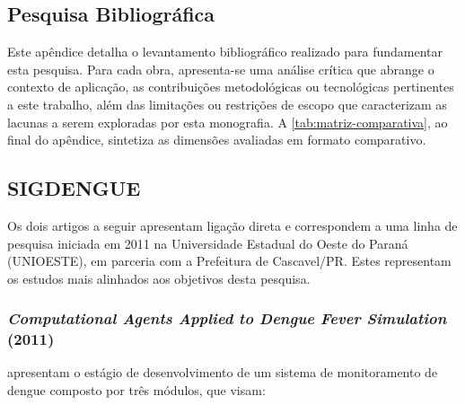 
\begin{apendicesenv}

\partapendices

\chapter{Pesquisa Bibliográfica}
\label{ap-pesquisa-bibliografica}

Este apêndice detalha o levantamento bibliográfico realizado para fundamentar esta pesquisa.
Para cada obra, apresenta-se uma análise crítica que abrange o
contexto de aplicação, as contribuições metodológicas ou tecnológicas pertinentes
a este trabalho, além das limitações ou restrições de escopo que caracterizam as
lacunas a serem exploradas por esta monografia. A \autoref{tab:matriz-comparativa},
ao final do apêndice, sintetiza as dimensões avaliadas em formato comparativo.

\section{SIGDENGUE}
\label{ap:sigdengue-linha}

Os dois artigos a seguir apresentam ligação direta e correspondem a uma linha de
pesquisa iniciada em 2011 na Universidade Estadual do Oeste do Paraná (UNIOESTE),
em parceria com a Prefeitura de Cascavel/PR. Estes representam os estudos mais
alinhados aos objetivos desta pesquisa.

\subsection{\textit{Computational Agents Applied to Dengue Fever Simulation} (2011)}
\label{ap:rizzi2011}

 apresentam o estágio de desenvolvimento de um
sistema de monitoramento de dengue composto por três módulos, que visam:


\end{apendicesenv}
